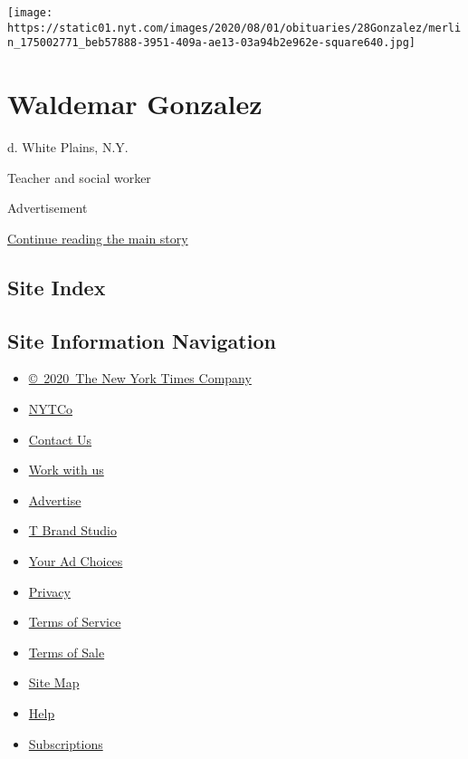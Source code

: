\texttt{[image: https://static01.nyt.com/images/2020/08/01/obituaries/28Gonzalez/merlin\_175002771\_beb57888-3951-409a-ae13-03a94b2e962e-square640.jpg]}

\hypertarget{waldemar-gonzalez}{%
\section{Waldemar Gonzalez}\label{waldemar-gonzalez}}

d. White Plains, N.Y.

Teacher and social worker

Advertisement

\protect\hyperlink{after-bottom}{Continue reading the main story}

\hypertarget{site-index}{%
\subsection{Site Index}\label{site-index}}

\hypertarget{site-information-navigation}{%
\subsection{Site Information
Navigation}\label{site-information-navigation}}

\begin{itemize}
\tightlist
\item
  \href{https://help.nytimes.com/hc/en-us/articles/115014792127-Copyright-notice}{©~2020~The
  New York Times Company}
\end{itemize}

\begin{itemize}
\tightlist
\item
  \href{https://www.nytco.com/}{NYTCo}
\item
  \href{https://help.nytimes.com/hc/en-us/articles/115015385887-Contact-Us}{Contact
  Us}
\item
  \href{https://www.nytco.com/careers/}{Work with us}
\item
  \href{https://nytmediakit.com/}{Advertise}
\item
  \href{http://www.tbrandstudio.com/}{T Brand Studio}
\item
  \href{https://www.nytimes.com/privacy/cookie-policy\#how-do-i-manage-trackers}{Your
  Ad Choices}
\item
  \href{https://www.nytimes.com/privacy}{Privacy}
\item
  \href{https://help.nytimes.com/hc/en-us/articles/115014893428-Terms-of-service}{Terms
  of Service}
\item
  \href{https://help.nytimes.com/hc/en-us/articles/115014893968-Terms-of-sale}{Terms
  of Sale}
\item
  \href{https://spiderbites.nytimes.com}{Site Map}
\item
  \href{https://help.nytimes.com/hc/en-us}{Help}
\item
  \href{https://www.nytimes.com/subscription?campaignId=37WXW}{Subscriptions}
\end{itemize}
